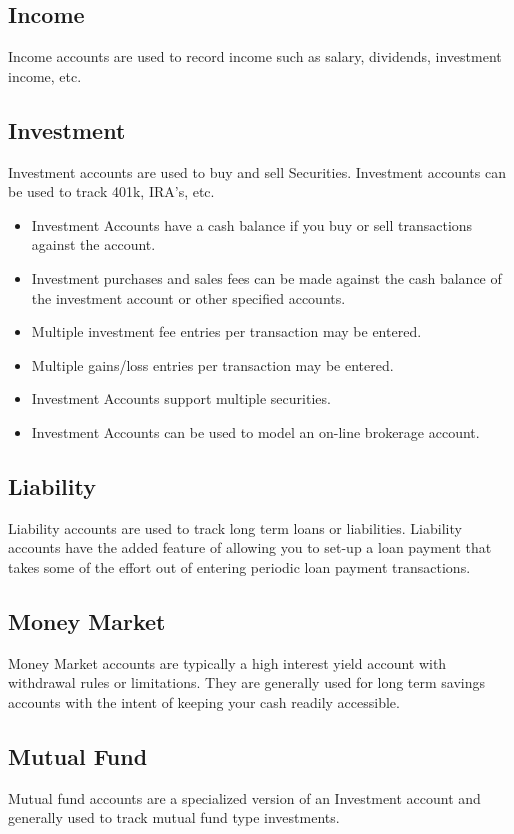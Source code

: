\documentclass[letterpaper,12pt]{book}
\begin{document}
    \subsection{Income}
    Income accounts are used to record income such as salary, dividends, investment income, etc.

    \subsection{Investment}
    Investment accounts are used to buy and sell Securities.
    Investment accounts can be used to track 401k, IRA's, etc.

    \begin{itemize}
        \item Investment Accounts have a cash balance if you buy or sell transactions against the account.
        \item Investment purchases and sales fees can be made against the cash balance of the investment account or
        other specified accounts.
        \item Multiple investment fee entries per transaction may be entered.
        \item Multiple gains/loss entries per transaction may be entered.
        \item Investment Accounts support multiple securities.
        \item Investment Accounts can be used to model an on-line brokerage account.
    \end{itemize}

    \subsection{Liability}
    Liability accounts are used to track long term loans or liabilities.
    Liability accounts have the added feature of allowing you to set-up a loan payment that takes some of the
    effort out of entering periodic loan payment transactions.

    \subsection{Money Market}
    Money Market accounts are typically a high interest yield account with withdrawal rules or limitations.
    They are generally used for long term savings accounts with the intent of keeping your cash readily accessible.

    \subsection{Mutual Fund}
    Mutual fund accounts are a specialized version of an Investment account and generally used to track mutual fund type
    investments.
\end{document}
